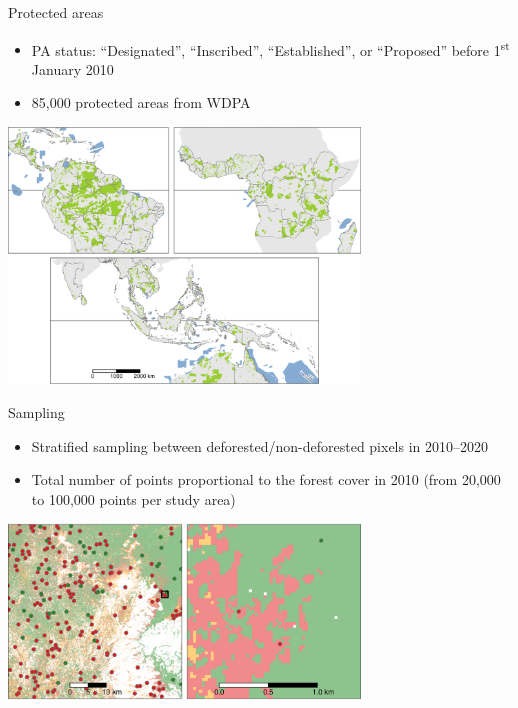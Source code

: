 \documentclass[10pt,table,dvipsnames,compress]{beamer}
\begin{document}
\begin{frame}[label={sec:org473f583}]{Protected areas}
\begin{itemize}
\item PA status: ``Designated'', ``Inscribed'', ``Established'', or ``Proposed''
before 1\textsuperscript{st} January 2010
\item 85,000 protected areas from WDPA
\end{itemize}

\centering \includegraphics[width=0.7\textwidth]{figs/sm/pa}
\end{frame}

\begin{frame}[label={sec:org5a93361}]{Sampling}
\begin{itemize}
\item Stratified sampling between deforested/non-deforested pixels in
2010--2020
\item Total number of points proportional to the forest cover in 2010 (from
20,000 to 100,000 points per study area)
\end{itemize}

\centering \includegraphics[width=0.7\textwidth]{figs/sm/sample.png}
\end{frame}
\end{document}
